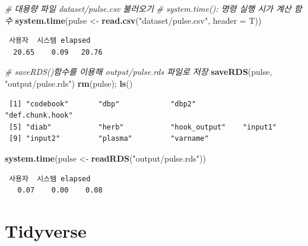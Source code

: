 \documentclass[
  11pt,
]{krantz}
\newenvironment{Shaded}{\begin{snugshade}}{\end{snugshade}}
\newcommand{\CommentTok}[1]{\textcolor[rgb]{0.37,0.37,0.37}{\textit{#1}}}
\newcommand{\DataTypeTok}[1]{\textcolor[rgb]{0.27,0.27,0.27}{#1}}
\newcommand{\KeywordTok}[1]{\textcolor[rgb]{0.27,0.27,0.27}{\textbf{#1}}}
\newcommand{\NormalTok}[1]{#1}
\newcommand{\StringTok}[1]{\textcolor[rgb]{0.5,0.5,0.5}{#1}}
\begin{document}
\footnotesize

\begin{Shaded}
\begin{Highlighting}[]
\CommentTok{# 대용량 파일 dataset/pulse.csv 불러오기}
\CommentTok{# system.time(): 명령 실행 시가 계산 함수}
\KeywordTok{system.time}\NormalTok{(pulse <-}\StringTok{ }\KeywordTok{read.csv}\NormalTok{(}\StringTok{"dataset/pulse.csv"}\NormalTok{, }\DataTypeTok{header =}\NormalTok{ T))}
\end{Highlighting}
\end{Shaded}

\begin{verbatim}
 사용자  시스템 elapsed 
  20.65    0.09   20.76 
\end{verbatim}

\begin{Shaded}
\begin{Highlighting}[]
\CommentTok{# saveRDS()함수를 이용해 output/pulse.rds 파일로 저장}
\KeywordTok{saveRDS}\NormalTok{(pulse, }\StringTok{"output/pulse.rds"}\NormalTok{)}
\KeywordTok{rm}\NormalTok{(pulse); }\KeywordTok{ls}\NormalTok{()}
\end{Highlighting}
\end{Shaded}

\begin{verbatim}
 [1] "codebook"       "dbp"            "dbp2"           "def.chunk.hook"
 [5] "diab"           "herb"           "hook_output"    "input1"        
 [9] "input2"         "plasma"         "varname"       
\end{verbatim}

\begin{Shaded}
\begin{Highlighting}[]
\KeywordTok{system.time}\NormalTok{(pulse <-}\StringTok{ }\KeywordTok{readRDS}\NormalTok{(}\StringTok{"output/pulse.rds"}\NormalTok{))}
\end{Highlighting}
\end{Shaded}

\begin{verbatim}
 사용자  시스템 elapsed 
   0.07    0.00    0.08 
\end{verbatim}

\normalsize

\hypertarget{tidyverse}{%
\section{Tidyverse}\label{tidyverse}}
\end{document}
